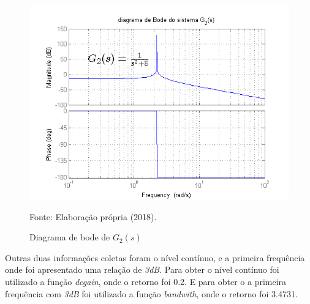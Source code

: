 \begin{figure}[h!]
    \centering
    \caption{Diagrama de bode de $G_2(s)$}
    \includegraphics[scale=0.55]{img/task_7_05.png}
    \label{f5}
    \begin{flushleft}
        Fonte: Elaboração própria (2018).
    \end{flushleft}
\end{figure}

Outras duas informações coletas foram o nível contínuo, e a primeira frequência onde foi apresentado uma relação de \textit{3dB}. Para obter o nível contínuo foi utilizado a função \textit{dcgain}, onde o retorno foi 0.2. E para obter o a primeira frequência com \textit{3dB} foi utilizado a função \textit{bandwith}, onde o retorno foi 3.4731.

